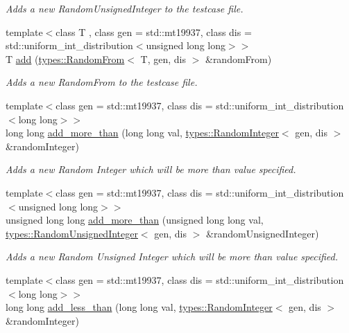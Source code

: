 \begin{DoxyCompactItemize}
\begin{DoxyCompactList}\small\item\em Adds a new Random\+Unsigned\+Integer to the testcase file. \end{DoxyCompactList}\item 
{\footnotesize template$<$class T , class gen  = std\+::mt19937, class dis  = std\+::uniform\+\_\+int\+\_\+distribution$<$unsigned long long$>$$>$ }\\T \mbox{\hyperlink{classtestcaser_1_1maker_1_1TestCaseBuilder_a9c3e973820d032cce82ab0d070c700f9}{add}} (\mbox{\hyperlink{structtestcaser_1_1maker_1_1types_1_1RandomFrom}{types\+::\+Random\+From}}$<$ T, gen, dis $>$ \&random\+From)
\begin{DoxyCompactList}\small\item\em Adds a new Random\+From to the testcase file. \end{DoxyCompactList}\item 
{\footnotesize template$<$class gen  = std\+::mt19937, class dis  = std\+::uniform\+\_\+int\+\_\+distribution$<$long long$>$$>$ }\\long long \mbox{\hyperlink{classtestcaser_1_1maker_1_1TestCaseBuilder_ac6cfa5b3269b899b19fc5b4d2e97b4aa}{add\+\_\+more\+\_\+than}} (long long val, \mbox{\hyperlink{classtestcaser_1_1maker_1_1types_1_1RandomInteger}{types\+::\+Random\+Integer}}$<$ gen, dis $>$ \&random\+Integer)
\begin{DoxyCompactList}\small\item\em Adds a new Random Integer which will be more than value specified. \end{DoxyCompactList}\item 
{\footnotesize template$<$class gen  = std\+::mt19937, class dis  = std\+::uniform\+\_\+int\+\_\+distribution$<$unsigned long long$>$$>$ }\\unsigned long long \mbox{\hyperlink{classtestcaser_1_1maker_1_1TestCaseBuilder_a00745e4a312209178432e06d4c9aae08}{add\+\_\+more\+\_\+than}} (unsigned long long val, \mbox{\hyperlink{classtestcaser_1_1maker_1_1types_1_1RandomUnsignedInteger}{types\+::\+Random\+Unsigned\+Integer}}$<$ gen, dis $>$ \&random\+Unsigned\+Integer)
\begin{DoxyCompactList}\small\item\em Adds a new Random Unsigned Integer which will be more than value specified. \end{DoxyCompactList}\item 
{\footnotesize template$<$class gen  = std\+::mt19937, class dis  = std\+::uniform\+\_\+int\+\_\+distribution$<$long long$>$$>$ }\\long long \mbox{\hyperlink{classtestcaser_1_1maker_1_1TestCaseBuilder_a6649b1f108aae10780562876df58a5b2}{add\+\_\+less\+\_\+than}} (long long val, \mbox{\hyperlink{classtestcaser_1_1maker_1_1types_1_1RandomInteger}{types\+::\+Random\+Integer}}$<$ gen, dis $>$ \&random\+Integer)

\end{DoxyCompactItemize}
